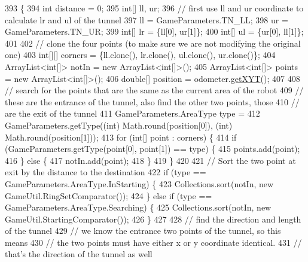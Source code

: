 \begin{DoxyCode}
393                                                  \{
394     \textcolor{keywordtype}{int} distance = 0;
395     \textcolor{keywordtype}{int}[] ll, ur;
396     \textcolor{comment}{// first use ll and ur coordinate to calculate lr and ul of the tunnel}
397     ll = GameParameters.TN\_LL;
398     ur = GameParameters.TN\_UR;
399     \textcolor{keywordtype}{int}[] lr = \{ll[0], ur[1]\};
400     \textcolor{keywordtype}{int}[] ul = \{ur[0], ll[1]\};
401 
402     \textcolor{comment}{// clone the four points (to make sure we are not modifying the original one)}
403     \textcolor{keywordtype}{int}[][] corners = \{ll.clone(), lr.clone(), ul.clone(), ur.clone()\};
404     ArrayList<int[]> notIn = \textcolor{keyword}{new} ArrayList<int[]>();
405     ArrayList<int[]> points = \textcolor{keyword}{new} ArrayList<int[]>();
406     \textcolor{keywordtype}{double}[] position = odometer.\hyperlink{classca_1_1mcgill_1_1ecse211_1_1odometer_1_1_odometer_data_a8f40f0264c68f0cbed4fff1723ae7863}{getXYT}();
407 
408     \textcolor{comment}{// search for the points that are the same as the current area of the robot}
409     \textcolor{comment}{// these are the entrance of the tunnel, also find the other two points, those}
410     \textcolor{comment}{// are the exit of the tunnel}
411     GameParameters.AreaType type =
412         GameParameters.getType((\textcolor{keywordtype}{int}) Math.round(position[0]), (int) Math.round(position[1]));
413     \textcolor{keywordflow}{for} (\textcolor{keywordtype}{int}[] point : corners) \{
414       \textcolor{keywordflow}{if} (GameParameters.getType(point[0], point[1]) == type) \{
415         points.add(point);
416       \} \textcolor{keywordflow}{else} \{
417         notIn.add(point);
418       \}
419     \}
420 
421     \textcolor{comment}{// Sort the two point at exit by the distance to the destination}
422     \textcolor{keywordflow}{if} (type == GameParameters.AreaType.InStarting) \{
423       Collections.sort(notIn, \textcolor{keyword}{new} GameUtil.RingSetComparator());
424     \} \textcolor{keywordflow}{else} \textcolor{keywordflow}{if} (type == GameParameters.AreaType.Searching) \{
425       Collections.sort(notIn, \textcolor{keyword}{new} GameUtil.StartingComparator());
426     \}
427 
428     \textcolor{comment}{// find the direction and length of the tunnel}
429     \textcolor{comment}{// we know the entrance two points of the tunnel, so this means}
430     \textcolor{comment}{// the two points must have either x or y coordinate identical.}
431     \textcolor{comment}{// that's the direction of the tunnel as well}

\end{DoxyCode}
